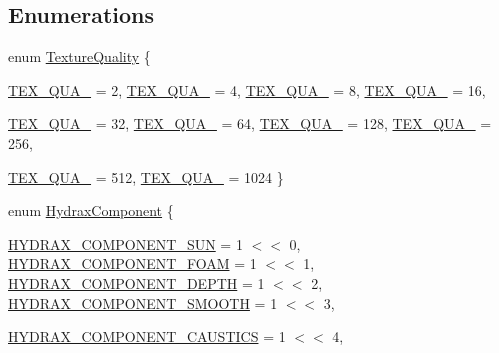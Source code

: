 \subsection*{Enumerations}
\begin{CompactItemize}
\item 
enum \hyperlink{namespace_hydrax_98bba1da65ee3695e9acde6904669070}{TextureQuality} \{ \par
\hyperlink{namespace_hydrax_98bba1da65ee3695e9acde690466907013824bd5f2e00064e13879a3aed066f7}{TEX\_\-QUA\_} =  2, 
\hyperlink{namespace_hydrax_98bba1da65ee3695e9acde69046690702c54cb34b904921012f12bfed49a616c}{TEX\_\-QUA\_} =  4, 
\hyperlink{namespace_hydrax_98bba1da65ee3695e9acde6904669070ecfa2867c6e6ff49c6fe3de1ee14dfb5}{TEX\_\-QUA\_} =  8, 
\hyperlink{namespace_hydrax_98bba1da65ee3695e9acde690466907059ce2a1e784a9678d9fe8c53b17ff77a}{TEX\_\-QUA\_} =  16, 
\par
\hyperlink{namespace_hydrax_98bba1da65ee3695e9acde6904669070213ee3a8654bbdf324b37c2aa7646955}{TEX\_\-QUA\_} =  32, 
\hyperlink{namespace_hydrax_98bba1da65ee3695e9acde6904669070484d5d48abafe0b988868615a1ff2bfe}{TEX\_\-QUA\_} =  64, 
\hyperlink{namespace_hydrax_98bba1da65ee3695e9acde69046690703356abd73b2ab0f647af5353fb0018f4}{TEX\_\-QUA\_} =  128, 
\hyperlink{namespace_hydrax_98bba1da65ee3695e9acde6904669070060fdd6477e0aa66c348fe0969919d1b}{TEX\_\-QUA\_} =  256, 
\par
\hyperlink{namespace_hydrax_98bba1da65ee3695e9acde69046690705ea2b7bdbf85bea10a3deae43d57644e}{TEX\_\-QUA\_} =  512, 
\hyperlink{namespace_hydrax_98bba1da65ee3695e9acde6904669070f9e07a2b8439f2f9a113d777eb9afc00}{TEX\_\-QUA\_} =  1024
 \}
\item 
enum \hyperlink{namespace_hydrax_e8e15abf83a51b0cf514c7d1a133650a}{HydraxComponent} \{ \par
\hyperlink{namespace_hydrax_e8e15abf83a51b0cf514c7d1a133650ac4c50e1c15a4242bae28b68b1784f6cb}{HYDRAX\_\-COMPONENT\_\-SUN} =  1 $<$$<$ 0, 
\hyperlink{namespace_hydrax_e8e15abf83a51b0cf514c7d1a133650afbc9669fa36754e818079547219e3fd4}{HYDRAX\_\-COMPONENT\_\-FOAM} =  1 $<$$<$ 1, 
\hyperlink{namespace_hydrax_e8e15abf83a51b0cf514c7d1a133650a6589f4ae29b66557b9c0da80e563e710}{HYDRAX\_\-COMPONENT\_\-DEPTH} =  1 $<$$<$ 2, 
\hyperlink{namespace_hydrax_e8e15abf83a51b0cf514c7d1a133650a72cc575e7f40e9b5fe18cadcecd09b71}{HYDRAX\_\-COMPONENT\_\-SMOOTH} =  1 $<$$<$ 3, 
\par
\hyperlink{namespace_hydrax_e8e15abf83a51b0cf514c7d1a133650afe9facf191be0c10b4f69830f710fb14}{HYDRAX\_\-COMPONENT\_\-CAUSTICS} =  1 $<$$<$ 4, 
$$
\end{CompactItemize}
